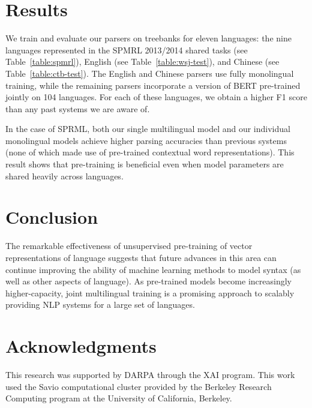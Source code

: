 \documentclass[11pt,a4paper]{article}
\begin{document}
\begin{table}
\begin{center}
\end{center}
\caption{\label{table:ctb-test} Comparison of F1 scores on the Chinese Treebank 5.1 test set.}
\end{table}

\section{Results}
\label{sec:results}

We train and evaluate our parsers on treebanks for eleven languages: the nine languages represented in the SPMRL 2013/2014 shared tasks \citep{seddah_overview_2013} (see Table~\ref{table:spmrl}), English (see Table~\ref{table:wsj-test}), and Chinese (see Table~\ref{table:ctb-test}). The English and Chinese parsers use fully monolingual training, while the remaining parsers incorporate a version of BERT pre-trained jointly on 104 languages. For each of these languages, we obtain a higher F1 score than any past systems we are aware of.

In the case of SPRML, both our single multilingual model and our individual monolingual models achieve higher parsing accuracies than previous systems (none of which made use of pre-trained contextual word representations). This result shows that pre-training is beneficial even when model parameters are shared heavily across languages.

\section{Conclusion}

The remarkable effectiveness of unsupervised pre-training of vector representations of language suggests that future advances in this area can continue improving the ability of machine learning methods to model syntax (as well as other aspects of language).
As pre-trained models become increasingly higher-capacity, joint multilingual training is a promising approach to scalably providing NLP systems for a large set of languages.

\section*{Acknowledgments}

This research was supported by DARPA through the XAI program. This work used the Savio computational cluster provided by the Berkeley Research Computing program at the University of California, Berkeley. 



\end{document}

